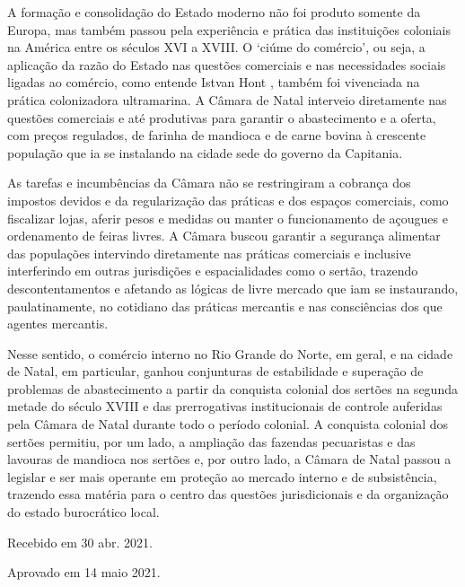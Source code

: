 \begin{refsection}
A formação e consolidação do Estado moderno não foi produto somente da Europa, mas também passou pela experiência e prática das instituições coloniais na América entre os séculos XVI a XVIII. O ‘ciúme do comércio’, ou seja, a aplicação da razão do Estado nas questões comerciais e nas necessidades sociais ligadas ao comércio, como entende Istvan Hont \citeyear{hont2005jealousy}, também foi vivenciada na prática colonizadora ultramarina. A Câmara de Natal interveio diretamente nas questões comerciais e até produtivas para garantir o abastecimento e a oferta, com preços regulados, de farinha de mandioca e de carne bovina à crescente população que ia se instalando na cidade sede do governo da Capitania.

As tarefas e incumbências da Câmara não se restringiram a cobrança dos impostos devidos e da regularização das práticas e dos espaços comerciais, como fiscalizar lojas, aferir pesos e medidas ou manter o funcionamento de açougues e ordenamento de feiras livres. A Câmara buscou garantir a segurança alimentar das populações intervindo diretamente nas práticas comerciais e inclusive interferindo em outras jurisdições e espacialidades como o sertão, trazendo descontentamentos e afetando as lógicas de livre mercado que iam se instaurando, paulatinamente, no cotidiano das práticas mercantis e nas consciências dos que agentes mercantis.

Nesse sentido, o comércio interno no Rio Grande do Norte, em geral, e na cidade de Natal, em particular, ganhou conjunturas de estabilidade e superação de problemas de abastecimento a partir da conquista colonial dos sertões na segunda metade do século XVIII e das prerrogativas institucionais de controle auferidas pela Câmara de Natal durante todo o período colonial. A conquista colonial dos sertões permitiu, por um lado, a ampliação das fazendas pecuaristas e das lavouras de mandioca nos sertões e, por outro lado, a Câmara de Natal passou a legislar e ser mais operante em proteção ao mercado interno e de subsistência, trazendo essa matéria para o centro das questões jurisdicionais e da organização do estado burocrático local. 

\printbibliography[heading=subbibliography,notcategory=fullcited]

\hfill Recebido em 30 abr. 2021.

\hfill Aprovado em 14 maio 2021.

\label{chap:farinhaend}

\cleardoublepage

\begin{vplace}

\end{vplace}
\end{refsection}
